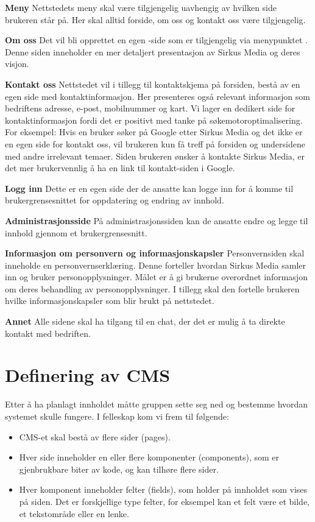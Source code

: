 \textbf{Meny} Nettstedets meny skal være tilgjengelig uavhengig av hvilken side brukeren står på. Her skal alltid forside, om oss og kontakt oss være tilgjengelig. 

\textbf{Om oss} Det vil bli opprettet en egen -side som er tilgjengelig via menypunktet . Denne siden inneholder en mer detaljert presentasjon av Sirkus Media og deres visjon.

\textbf{Kontakt oss} Nettstedet vil i tillegg til kontaktskjema på forsiden, bestå av en egen side med kontaktinformasjon. Her presenteres også relevant informasjon som bedriftens adresse, e-post, mobilnummer og kart. Vi lager en dedikert side for kontaktinformasjon fordi det er positivt med tanke på søkemotoroptimalisering. For eksempel: Hvis en bruker søker på Google etter Sirkus Media og det ikke er en egen side for kontakt oss, vil brukeren kun få treff på forsiden og undersidene med andre irrelevant temaer. Siden brukeren ønsker å kontakte Sirkus Media, er det mer brukervennlig å ha en link til kontakt-siden i Google.

\textbf{Logg inn} Dette er en egen side der de ansatte kan logge inn for å komme til brukergrensesnittet for oppdatering og endring av innhold.

\textbf{Administrasjonsside}  På administrasjonssiden kan de ansatte endre og legge til innhold gjennom et brukergrensesnitt.

\textbf{Informasjon om personvern og informasjonskapsler} Personvernsiden skal inneholde en personvernserklæring. Denne forteller hvordan Sirkus Media samler inn og bruker personopplysninger. Målet er å gi brukerne overordnet informasjon om deres behandling av personopplysninger. I tillegg skal den fortelle brukeren hvilke informasjonskapsler som blir brukt på nettstedet.

\textbf{Annet} Alle sidene skal ha tilgang til en chat, der det er mulig å ta direkte kontakt med bedriften.

\section{Definering av CMS}
\label{sec-planning-cms}
Etter å ha planlagt innholdet måtte gruppen sette seg ned og bestemme hvordan systemet skulle fungere. I felleskap kom vi frem til følgende:

\begin{itemize}
    \item CMS-et skal bestå av flere sider (pages).
    \item Hver side inneholder en eller flere komponenter (components), som er gjenbrukbare biter av kode, og kan tilhøre flere sider.
    \item Hver komponent inneholder felter (fields), som holder på innholdet som vises på siden. Det er forskjellige type felter, for eksempel kan et felt være et bilde, et tekstområde eller en lenke. 
\end{itemize}

